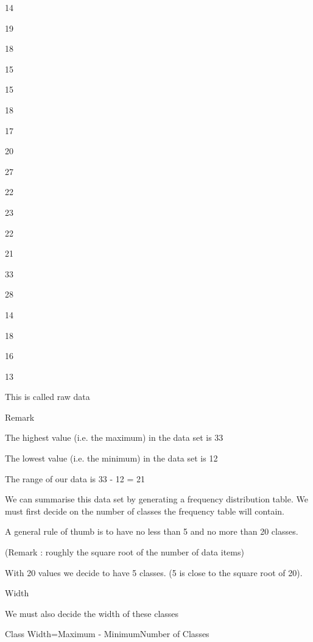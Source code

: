 14
 

19
 

18
 

15
 

15
 

18
 

17
 

20
 

 27
 



22
 

23
 

22
 

21
 

33
 

28
 

14
 

18
 

16
 

 13
 

 

This is called raw data

 

Remark

The highest value (i.e. the maximum)  in the data set is 33

 

The lowest value (i.e. the minimum) in the data set is 12

 

The range of our data is 33 - 12 = 21

 

 


 


We can summarise this data set by generating a frequency distribution table. We must first decide on the number of classes the frequency table will contain.

 

A general rule of thumb is to have no less than 5 and no more than 20 classes.

(Remark : roughly the square root of the number of data items)

 

With 20 values we decide to have 5 classes. (5 is close to the square root of 20).

 

 

Width

 

We must also decide the width of these classes

 

Class Width=Maximum - MinimumNumber of Classes

